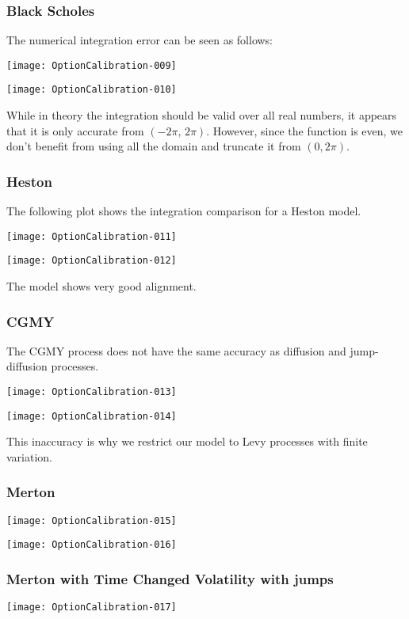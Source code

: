 \documentclass{article}
\begin{document}
\subsubsection{Black Scholes}
The numerical integration error can be seen as follows:

\texttt{[image: OptionCalibration-009]}

\texttt{[image: OptionCalibration-010]}




While in theory the integration should be valid over all real numbers, it appears that it is only accurate from \((-2\pi,\,2\pi)\).  However, since the function is even, we don't benefit from using all the domain and truncate it from \((0, 2 \pi)\).

\subsubsection{Heston}

The following plot shows the integration comparison for a Heston model.

\texttt{[image: OptionCalibration-011]}

\texttt{[image: OptionCalibration-012]}

The model shows very good alignment.


\subsubsection{CGMY}

The CGMY process does not have the same accuracy as diffusion and jump-diffusion processes.

\texttt{[image: OptionCalibration-013]}

\texttt{[image: OptionCalibration-014]}

This inaccuracy is why we restrict our model to Levy processes with finite variation.  

\subsubsection{Merton}

\texttt{[image: OptionCalibration-015]}

\texttt{[image: OptionCalibration-016]}


\subsubsection{Merton with Time Changed Volatility with jumps}
\texttt{[image: OptionCalibration-017]}
\end{document}
